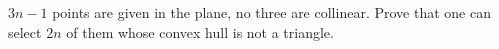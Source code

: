 $3n-1$ points are given in the plane, no three are collinear. Prove that one can select $2n$ of them whose convex hull is not a triangle.